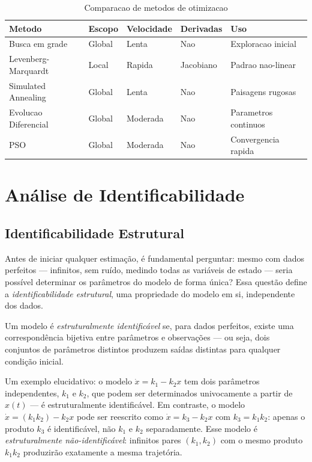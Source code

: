 \begin{table}[h]
\centering
\caption{Comparacao de metodos de otimizacao}
\label{tab:otimizacao}
\begin{tabular}{lllll}
\toprule
\textbf{Metodo} & \textbf{Escopo} & \textbf{Velocidade} & \textbf{Derivadas} & \textbf{Uso} \\
\midrule
Busca em grade & Global & Lenta & Nao & Exploracao inicial \\
Levenberg-Marquardt & Local & Rapida & Jacobiano & Padrao nao-linear \\
Simulated Annealing & Global & Lenta & Nao & Paisagens rugosas \\
Evolucao Diferencial & Global & Moderada & Nao & Parametros continuos \\
PSO & Global & Moderada & Nao & Convergencia rapida \\
\bottomrule
\end{tabular}
\end{table}


\section{Análise de Identificabilidade}

\subsection{Identificabilidade Estrutural}

Antes de iniciar qualquer estimação, é fundamental perguntar: mesmo com dados perfeitos ---
infinitos, sem ruído, medindo todas as variáveis de estado --- seria possível determinar
os parâmetros do modelo de forma única? Essa questão define a \emph{identificabilidade
estrutural}, uma propriedade do modelo em si, independente dos dados.

\begin{definicaoenv}
Um modelo é \emph{estruturalmente identificável} se, para dados perfeitos, existe uma
correspondência bijetiva entre parâmetros e observações --- ou seja, dois conjuntos de
parâmetros distintos produzem saídas distintas para qualquer condição inicial.
\end{definicaoenv}

Um exemplo elucidativo: o modelo $\dot{x} = k_1 - k_2 x$ tem dois parâmetros independentes,
$k_1$ e $k_2$, que podem ser determinados univocamente a partir de $x(t)$ --- é
estruturalmente identificável. Em contraste, o modelo $\dot{x} = (k_1 k_2) - k_2 x$
pode ser reescrito como $\dot{x} = k_3 - k_2 x$ com $k_3 = k_1 k_2$: apenas o produto
$k_3$ é identificável, não $k_1$ e $k_2$ separadamente. Esse modelo é \emph{estruturalmente
não-identificável}: infinitos pares $(k_1, k_2)$ com o mesmo produto $k_1 k_2$ produzirão
exatamente a mesma trajetória.

